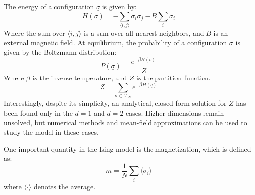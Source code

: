 The energy of a configuration $\underline{\sigma}$ is given by:
\begin{equation}
    H(\underline{\sigma}) = -\sum_{\langle i,j\rangle}\sigma_i\sigma_j - B\sum_i \sigma_i
\end{equation}
Where the sum over $\langle i,j\rangle$ is a sum over all nearest neighbors, and $B$ is an external magnetic field. At equilibrium, the probability of a configuration $\underline{\sigma}$ is given by the Boltzmann distribution:
\begin{equation}
    P(\underline{\sigma}) = \frac{e^{-\beta H(\underline{\sigma})}}{Z}
\end{equation}
Where $\beta$ is the inverse temperature, and $Z$ is the partition function:
\begin{equation}
    Z = \sum_{\underline{\sigma}\in\mathcal{X}_N}e^{-\beta H(\underline{\sigma})}
\end{equation}
Interestingly, despite its simplicity, an analytical, closed-form solution for \(Z\) has been found only in the $d=1$ and $d=2$ cases. Higher dimensions remain unsolved, but numerical methods and mean-field approximations can be used to study the model in these cases.

One important quantity in the Ising model is the magnetization, which is defined as:
\begin{equation}
    m = \frac{1}{N}\sum_i \langle \sigma_i \rangle
\end{equation}
where $\langle \cdot \rangle$ denotes the average.


